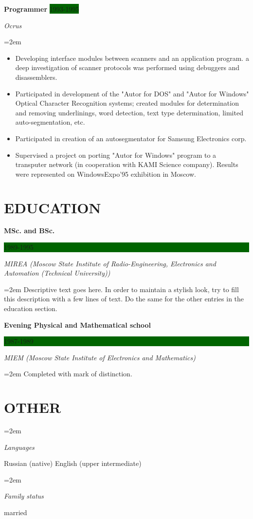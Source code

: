 \documentclass[paper=a4,fontsize=11pt]{scrartcl} %
\newlength{\spacebox}
\newcommand{\sepspace}{\vspace*{1em}}       %
\newcommand{\NewPart}[1]{\section*{\uppercase{#1}}}
\newcommand{\PersonalEntry}[2]{\pagebreak[2]
        \noindent\hangindent=2em\hangafter=0 %
        \parbox{\spacebox}{        %
        \textit{#1}}               %
        \hspace{1.5em} #2 \par}    %
\newcommand{\SkillsEntry}[2]{\pagebreak[2]      %
        \noindent\hangindent=2em\hangafter=0 %
        \parbox{\spacebox}{        %
        \textit{#1}}               %
        \hspace{1.5em} \vspace{1.5em}  \parbox{0.75\textwidth}{#2} \par}    %
\newcommand{\EducationEntry}[4]{\pagebreak[2]
        \noindent \textbf{#1} \hfill      %
        \colorbox{DarkGreen}{%
            \parbox{6em}{%
            \hfill\color{White}#2}} \par  %
        \noindent \textit{#3} \par        %
        \noindent\hangindent=2em\hangafter=0 \small #4 %
        \normalsize \par}
\newcommand{\WorkEntry}[4]{\pagebreak[2]    %
        \noindent \textbf{#1} \hfill      %
        \colorbox{DarkGreen}{\color{White}#2} \par  %
        \noindent \textit{#3} \par        %
        \noindent\hangindent=2em\hangafter=0 \small #4 %
        \normalsize \par         \sepspace}
\begin{document}
\WorkEntry{Programmer}{1993-1995}{Ocrus}{
\begin{itemize}\itemsep0em
\item Developing interface modules between scanners and an application program. a deep investigation of scanner protocols was performed using debuggers and disassemblers.
\item Participated in development of the "Autor for DOS" and "Autor  for  Windows" Optical Character  Recognition systems; created modules for determination and removing underlinings, word detection, text type determination, limited auto-segmentation, etc.
\item Participated in creation of an autosegmentator for Samsung Electronics corp.
\item Supervised a project on porting "Autor for Windows" program to a transputer network (in cooperation with KAMI Science company). Results were represented on WindowsExpo'95 exhibition in Moscow.  
\end{itemize}
}


\NewPart{Education}{}

\EducationEntry{MSc. and BSc.}{1989-1995}{MIREA (Moscow State Institute of Radio-Engineering, Electronics and Automation (Technical University))}{Descriptive text goes here. In order to maintain a stylish look, try to fill this description with a few lines of text. Do the same for the other entries in the education section.}
\sepspace

\EducationEntry{Evening Physical and Mathematical school}{1987-1989}{MIEM (Moscow State Institute of Electronics and Mathematics)}{Completed with mark of distinction.}

\NewPart{Other}{}

\SkillsEntry{Languages}{Russian (native) 
   English (upper intermediate)}
\SkillsEntry{Family status}{married}
\end{document}
